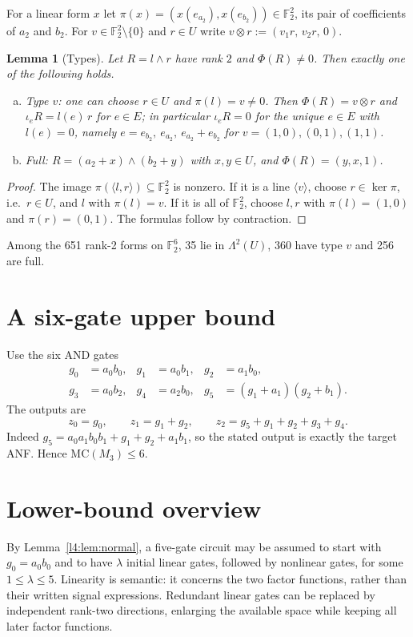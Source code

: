 \documentclass[11pt,a4paper]{article}
\theoremstyle{plain}
\newtheorem{lemma}[theorem]{Lemma}
\theoremstyle{remark}
\newcommand{\F}{\mathbb F_2}
\newcommand{\Lam}{\Lambda^2}
\newcommand{\Dir}{E}
\begin{document}
For a linear form $x$ let $\pi(x)=(x(e_{a_2}),x(e_{b_2}))\in\F^2$, its pair of coefficients of $a_2$ and $b_2$. For $v\in\F^2\setminus\{0\}$ and $r\in U$ write $v\otimes r:=(v_1r,\,v_2r,\,0)$.

\begin{lemma}[Types]\label{l4:lem:types}
Let $R=l\wedge r$ have rank $2$ and $\Phi(R)\neq0$. Then exactly one of the following holds.
\begin{enumerate}[(a)]
  \item \emph{Type $v$:} one can choose $r\in U$ and $\pi(l)=v\neq0$. Then $\Phi(R)=v\otimes r$ and $\iota_eR=l(e)\,r$ for $e\in\Dir$; in particular $\iota_eR=0$ for the unique $e\in\Dir$ with $l(e)=0$, namely $e=e_{b_2},\ e_{a_2},\ e_{a_2}+e_{b_2}$ for $v=(1,0),(0,1),(1,1)$.
  \item \emph{Full:} $R=(a_2+x)\wedge(b_2+y)$ with $x,y\in U$, and $\Phi(R)=(y,x,1)$.
\end{enumerate}
\end{lemma}

\begin{proof}
The image $\pi(\langle l,r\rangle)\subseteq\F^2$ is nonzero. If it is a line $\langle v\rangle$, choose $r\in\ker\pi$, i.e.\ $r\in U$, and $l$ with $\pi(l)=v$. If it is all of $\F^2$, choose $l,r$ with $\pi(l)=(1,0)$ and $\pi(r)=(0,1)$. The formulas follow by contraction.
\end{proof}

Among the 651 rank-2 forms on $\F^6$, 35 lie in $\Lam(U)$, 360 have type $v$ and 256 are full.


\section{A six-gate upper bound}\label{sec:upper}
Use the six AND gates
\begin{align*}
g_0&=a_0b_0,&g_1&=a_0b_1,&g_2&=a_1b_0,\\
g_3&=a_0b_2,&g_4&=a_2b_0,&g_5&=(g_1+a_1)(g_2+b_1).
\end{align*}
The outputs are
\[
 z_0=g_0,\qquad z_1=g_1+g_2,\qquad
 z_2=g_5+g_1+g_2+g_3+g_4.
\]
Indeed $g_5=a_0a_1b_0b_1+g_1+g_2+a_1b_1$, so the stated output is exactly the target ANF. Hence $\mathrm{MC}(M_3)\le6$.

\section{Lower-bound overview}\label{sec:overview}
By Lemma~\ref{l4:lem:normal}, a five-gate circuit may be assumed to start with $g_0=a_0b_0$ and to have $\lambda$ initial linear gates, followed by nonlinear gates, for some $1\le\lambda\le5$. Linearity is semantic: it concerns the two factor functions, rather than their written signal expressions. Redundant linear gates can be replaced by independent rank-two directions, enlarging the available space while keeping all later factor functions.
\end{document}

